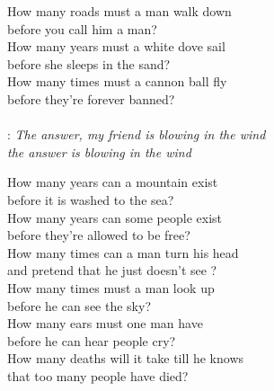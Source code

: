 
How many roads must a man walk down\\
before you call him a man?\\
How many years must a white dove sail\\
before she sleeps in the sand?\\
How many times must a cannon ball fly\\
before they're forever banned?\\
\\
\textregistered:
\emph{
The answer, my friend is blowing in the wind\\
the answer is blowing in the wind\\
}

How many years can a mountain exist\\
before it is washed to the sea?\\
How many years can some people exist\\
before they're allowed to be free?\\
How many times can a man turn his head\\
and pretend that he just doesn't see ? \hspace{1cm} \textregistered\\

How many times must a man look up\\
before he can see the sky?\\
How many ears must one man have\\
before he can hear people cry?\\
How many deaths will it take till he knows\\
that too many people have died? \hspace{1cm} \textregistered
\newpage

